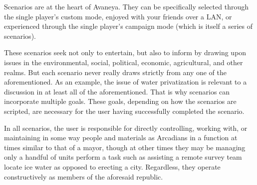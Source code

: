 

Scenarios are at the heart of Avaneya. They can be specifically selected through the single player's custom mode, enjoyed with your friends over a LAN, or experienced through the single player's campaign mode (which is itself a series of scenarios). 

These scenarios seek not only to entertain, but also to inform by drawing upon issues in the environmental, social, political, economic, agricultural, and other realms. But each scenario never really draws strictly from any one of the aforementioned. As an example, the issue of water privatization is relevant to a discussion in at least all of the aforementioned. That is why scenarios can incorporate multiple goals. These goals, depending on how the scenarios are scripted, are necessary for the user having successfully completed the scenario.

In all scenarios, the user is responsible for directly controlling, working with, or maintaining in some way people and materials as Arcadians in a function at times similar to that of a mayor, though at other times they may be managing only a handful of units perform a task such as assisting a remote survey team locate ice water as opposed to erecting a city. Regardless, they operate constructively as members of the aforesaid republic.

